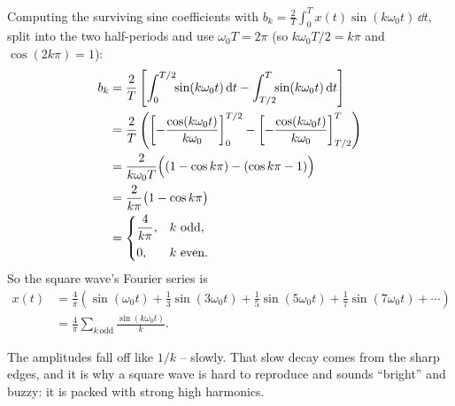 Computing the surviving sine coefficients with \(b_k = \frac{2}{T}\int_0^T x(t)\sin(k\omega_0 t)\,\dd t\),
split into the two half-periods and use \(\omega_0 T = 2\pi\) (so \(k\omega_0 T/2 = k\pi\) and \(\cos(2k\pi)=1\)):
\begin{align}
b_k &= \frac{2}{T}\left[\int_0^{T/2}\!\!\sin(k\omega_0 t)\,\mathrm{d} t - \int_{T/2}^{T}\!\!\sin(k\omega_0 t)\,\mathrm{d} t\right] \nonumber\\
&= \frac{2}{T}\left(\left[-\frac{\cos(k\omega_0 t)}{k\omega_0}\right]_0^{T/2} - \left[-\frac{\cos(k\omega_0 t)}{k\omega_0}\right]_{T/2}^{T}\right) \nonumber\\
&= \frac{2}{k\omega_0 T}\Bigl((1 - \cos k\pi) - (\cos k\pi - 1)\Bigr) \nonumber\\
&= \frac{2}{k\pi}\bigl(1 - \cos k\pi\bigr) \nonumber\\
&= \begin{cases} \dfrac{4}{k\pi}, & k \text{ odd},\\[6pt] 0, & k \text{ even}.\end{cases}
\label{ch06:square-bk}
\end{align}
So the square wave's Fourier series is
\begin{align}
x(t) &= \frac{4}{\pi}\left(\sin(\omega_0 t) + \frac{1}{3}\sin(3\omega_0 t) + \frac{1}{5}\sin(5\omega_0 t) + \frac{1}{7}\sin(7\omega_0 t) + \cdots\right) \nonumber\\
&= \frac{4}{\pi}\sum_{k\,\text{odd}} \frac{\sin(k\omega_0 t)}{k}.
\label{ch06:square-series}
\end{align}

The amplitudes fall off like \(1/k\) -- slowly. That slow decay comes from the sharp
edges, and it is why a square wave is hard to reproduce and sounds ``bright''
and buzzy: it is packed with strong high harmonics.

